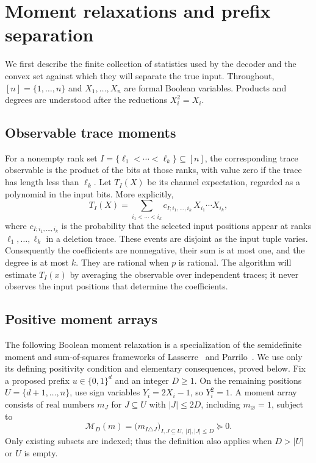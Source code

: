 \section{Moment relaxations and prefix separation}\label{sec:setup}

We first describe the finite collection of statistics used by the decoder
and the convex set against which they will separate the true input.
Throughout, $[n]=\{1,\ldots,n\}$ and $X_1,\ldots,X_n$ are formal Boolean
variables. Products and degrees are understood after the reductions
$X_i^2=X_i$.

\subsection{Observable trace moments}
For a nonempty rank set $I=\{\ell_1<\cdots<\ell_k\}\subseteq[n]$,
the corresponding trace observable is the product of the bits at those
ranks, with value zero if the trace has length less than $\ell_k$.
Let $T_I(X)$ be its channel expectation, regarded as a polynomial in
the input bits. More explicitly,
\[
 T_I(X)=\sum_{i_1<\cdots<i_k}
    c_{I;i_1,\ldots,i_k}\,X_{i_1}\cdots X_{i_k},
\]
where $c_{I;i_1,\ldots,i_k}$ is the probability that the selected input
positions appear at ranks $\ell_1,\ldots,\ell_k$ in a deletion trace.
These events are disjoint as the input tuple varies. Consequently the
coefficients are nonnegative, their sum is at most one, and the degree
is at most $k$. They are rational when $p$ is rational. The algorithm
will estimate $T_I(x)$ by averaging the observable over independent
traces; it never observes the input positions that determine the
coefficients.

\subsection{Positive moment arrays}

The following Boolean moment relaxation is a specialization of the
semidefinite moment and sum-of-squares frameworks of
Lasserre~\cite[Section~2]{Lasserre2001} and
Parrilo~\cite[Sections~4.2--4.3]{Parrilo2000}. We use only its defining
positivity condition and elementary consequences, proved below.
Fix a proposed prefix $u\in\{0,1\}^d$ and an integer $D\ge1$.
On the remaining positions $U=\{d+1,\ldots,n\}$, use sign variables
$Y_i=2X_i-1$, so $Y_i^2=1$. A moment array consists of real numbers
$m_J$ for $J\subseteq U$ with $|J|\le2D$, including $m_\varnothing=1$,
subject to
\begin{equation}\label{eq:moment-matrix}
 \mathcal M_D(m)=
 \bigl(m_{I\triangle J}\bigr)_{
       I,J\subseteq U,\ |I|,|J|\le D}\succeq0.
\end{equation}
Only existing subsets are indexed; thus the definition also applies
when $D>|U|$ or $U$ is empty.

